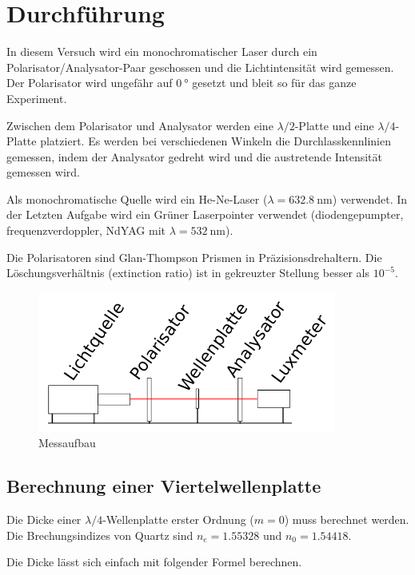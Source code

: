 \section{Durchf\"uhrung}

In   diesem   Versuch   wird    ein    monochromatischer    Laser    durch   ein
Polarisator/Analysator-Paar geschossen und die Lichtintensit\"at wird  gemessen.
Der Polarisator wird ungef\"ahr auf $\SI{0}{\degree}$ gesetzt und bleit so f\"ur
das ganze Experiment.

Zwischen dem Polarisator und Analysator werden  eine $\lambda/2$-Platte und eine
$\lambda/4$-Platte  platziert.  Es   werden   bei   verschiedenen   Winkeln  die
Durchlasskennlinien  gemessen,   indem  der  Analysator  gedreht  wird  und  die
austretende Intensit\"at gemessen wird.

Als       monochromatische        Quelle        wird       ein       He-Ne-Laser
($\lambda=\SI{632.8}{\nano\meter}$) verwendet. In der Letzten Aufgabe  wird  ein
Gr\"uner  Laserpointer verwendet (diodengepumpter, frequenzverdoppler, NdYAG mit
$\lambda=\SI{532}{\nano\meter}$).

Die Polarisatoren  sind  Glan-Thompson  Prismen  in  Pr\"azisionsdrehaltern. Die
L\"oschungsverh\"altnis (extinction ratio) ist in gekreuzter Stellung besser als
$10^{-5}$.

\begin{figure}[H]
    \centering
    \includegraphics[width=.7\linewidth]{images/messaufbau.pdf}
    \caption{Messaufbau}
    \label{fig:messaufbau}
\end{figure}


\subsection{Berechnung einer Viertelwellenplatte}

Die Dicke einer $\lambda/4$-Wellenplatte erster  Ordnung  ($m=0$) muss berechnet
werden. Die Brechungsindizes von  Quartz  sind  $n_e=1.55328$ und $n_0=1.54418$.

Die Dicke l\"asst sich einfach mit folgender Formel berechnen.

